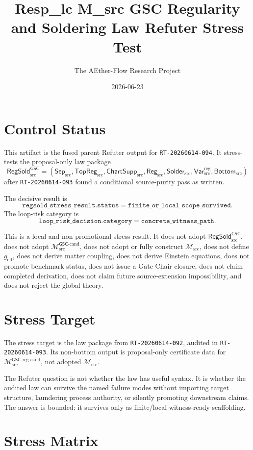 \documentclass[11pt]{article}
\title{Resp\_lc M\_src GSC Regularity and Soldering Law Refuter Stress Test}
\author{The AEther-Flow Research Project}
\date{2026-06-23}
\newcommand{\Msrc}{\mathcal{M}_{\mathrm{src}}}
\newcommand{\Mgsccand}{\mathcal{M}_{\mathrm{src}}^{\mathsf{GSC}\text{-}\mathrm{cand}}}
\newcommand{\Mgscregcand}{\mathcal{M}_{\mathrm{src}}^{\mathsf{GSC}\text{-}\mathrm{reg}\text{-}\mathrm{cand}}}
\newcommand{\geff}{g_{\mathrm{eff}}}
\newcommand{\RegSold}{\mathsf{RegSold}_{\mathrm{src}}^{\mathsf{GSC}}}
\newcommand{\SepSrc}{\mathsf{Sep}_{\mathrm{src}}}
\newcommand{\TopRegSrc}{\mathsf{TopReg}_{\mathrm{src}}}
\newcommand{\ChartSuppSrc}{\mathsf{ChartSupp}_{\mathrm{src}}}
\newcommand{\RegSrc}{\mathsf{Reg}_{\mathrm{src}}}
\newcommand{\SolderSrc}{\mathsf{Solder}_{\mathrm{src}}}
\newcommand{\VarRegSrc}{\mathsf{Var}^{\mathrm{reg}}_{\mathrm{src}}}
\newcommand{\BottomSrc}{\mathsf{Bottom}_{\mathrm{src}}}
\begin{document}
\maketitle

\section*{Control Status}

This artifact is the fused parent Refuter output for
\texttt{RT-20260614-094}. It stress-tests the proposal-only law package
\[
  \RegSold =
  (\SepSrc,\TopRegSrc,\ChartSuppSrc,\RegSrc,\SolderSrc,\VarRegSrc,\BottomSrc)
\]
after \texttt{RT-20260614-093} found a conditional source-purity pass as
written.

The decisive result is
\[
  \texttt{regsold\_stress\_result.status}
  =
  \texttt{finite\_or\_local\_scope\_survived}.
\]
The loop-risk category is
\[
  \texttt{loop\_risk\_decision.category}
  =
  \texttt{concrete\_witness\_path}.
\]

This is a local and non-promotional stress result. It does not adopt
\(\RegSold\), does not adopt \(\Mgsccand\), does not adopt or fully construct
\(\Msrc\), does not define \(\geff\), does not derive matter coupling, does
not derive Einstein equations, does not promote benchmark status, does not
issue a Gate Chair closure, does not claim completed derivation, does not
claim future source-extension impossibility, and does not reject the global
theory.

\section{Stress Target}

The stress target is the law package from \texttt{RT-20260614-092}, audited in
\texttt{RT-20260614-093}. Its non-bottom output is proposal-only certificate
data for \(\Mgscregcand\), not adopted \(\Msrc\).

The Refuter question is not whether the law has useful syntax. It is whether
the audited law can survive the named failure modes without importing target
structure, laundering process authority, or silently promoting downstream
claims. The answer is bounded: it survives only as finite/local witness-ready
scaffolding.

\section{Stress Matrix}
\end{document}
